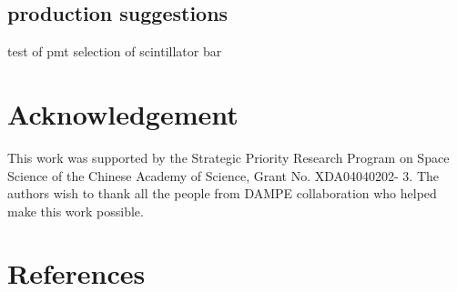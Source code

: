 \documentclass[5p, times]{elsarticle}
\begin{document}
\subsection{production suggestions}
test of pmt
selection of scintillator bar

\section*{Acknowledgement}
\label{sec:acknowledgement}

This work was supported by the Strategic Priority Research Program on Space Science of the Chinese Academy of Science,
Grant No. XDA04040202- 3. The authors wish to thank all the people from DAMPE collaboration who helped make this work
possible.

\section*{References}
\label{sec:reference}



\end{document}
